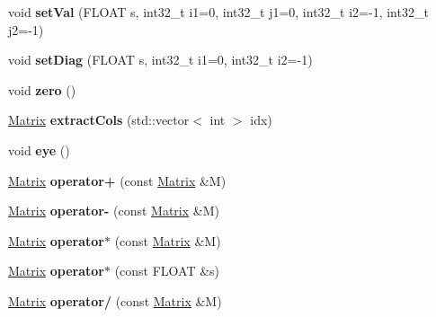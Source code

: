 \begin{DoxyCompactItemize}
\item 
\hypertarget{class_matrix_a2ab081682181316f8fb3ae332db70e7f}{void {\bfseries set\+Val} (F\+L\+O\+A\+T s, int32\+\_\+t i1=0, int32\+\_\+t j1=0, int32\+\_\+t i2=-\/1, int32\+\_\+t j2=-\/1)}\label{class_matrix_a2ab081682181316f8fb3ae332db70e7f}

\item 
\hypertarget{class_matrix_a2c390c659c86d574e5cf466b242eb714}{void {\bfseries set\+Diag} (F\+L\+O\+A\+T s, int32\+\_\+t i1=0, int32\+\_\+t i2=-\/1)}\label{class_matrix_a2c390c659c86d574e5cf466b242eb714}

\item 
\hypertarget{class_matrix_a0764fae6bafeb8425318d6e0e379727b}{void {\bfseries zero} ()}\label{class_matrix_a0764fae6bafeb8425318d6e0e379727b}

\item 
\hypertarget{class_matrix_afe73b7ba79e0f3bf55f9a00830a89708}{\hyperlink{class_matrix}{Matrix} {\bfseries extract\+Cols} (std\+::vector$<$ int $>$ idx)}\label{class_matrix_afe73b7ba79e0f3bf55f9a00830a89708}

\item 
\hypertarget{class_matrix_a4e1b3ed8d412f57ca763aecc021b7784}{void {\bfseries eye} ()}\label{class_matrix_a4e1b3ed8d412f57ca763aecc021b7784}

\item 
\hypertarget{class_matrix_a97423f7b6d26bc39be65d509ff5d3c7d}{\hyperlink{class_matrix}{Matrix} {\bfseries operator+} (const \hyperlink{class_matrix}{Matrix} \&M)}\label{class_matrix_a97423f7b6d26bc39be65d509ff5d3c7d}

\item 
\hypertarget{class_matrix_a9e99e7a1c257db2d14fae8c8724b5226}{\hyperlink{class_matrix}{Matrix} {\bfseries operator-\/} (const \hyperlink{class_matrix}{Matrix} \&M)}\label{class_matrix_a9e99e7a1c257db2d14fae8c8724b5226}

\item 
\hypertarget{class_matrix_ac7932eca3e71daaf886cef9c3ffe5540}{\hyperlink{class_matrix}{Matrix} {\bfseries operator$\ast$} (const \hyperlink{class_matrix}{Matrix} \&M)}\label{class_matrix_ac7932eca3e71daaf886cef9c3ffe5540}

\item 
\hypertarget{class_matrix_a7f140fbf8c1fdc0114f827e664f6524b}{\hyperlink{class_matrix}{Matrix} {\bfseries operator$\ast$} (const F\+L\+O\+A\+T \&s)}\label{class_matrix_a7f140fbf8c1fdc0114f827e664f6524b}

\item 
\hypertarget{class_matrix_aa28af39ae10b2deb31c448527a0d8752}{\hyperlink{class_matrix}{Matrix} {\bfseries operator/} (const \hyperlink{class_matrix}{Matrix} \&M)}\label{class_matrix_aa28af39ae10b2deb31c448527a0d8752}


\end{DoxyCompactItemize}
